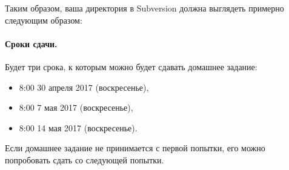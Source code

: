 \documentclass[a4paper,10pt]{article}
\begin{document}
Таким образом, ваша директория в Subversion должна выглядеть примерно следующим образом:

\paragraph{Сроки сдачи.}
Будет три срока, к которым можно будет сдавать домашнее задание:
\begin{itemize}
    \item 8:00 30 апреля 2017 (воскресенье),
    \item 8:00 7 мая 2017 (воскресенье),
    \item 8:00 14 мая 2017 (воскресенье).
\end{itemize}
Если домашнее задание не принимается с первой попытки, его
можно попробовать сдать со следующей попытки.
\end{document}
